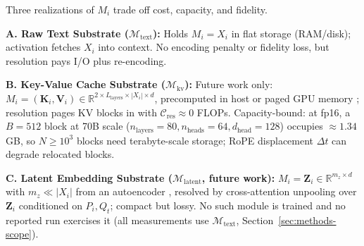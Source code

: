 \documentclass[conference]{IEEEtran}
\begin{document}
{\small
Three realizations of $M_i$ trade off cost, capacity, and fidelity.

\noindent\textbf{A. Raw Text Substrate ($\mathcal{M}_{\text{text}}$):}
Holds $M_i = X_i$ in flat storage (RAM/disk); activation fetches $X_i$ into context. No encoding penalty or fidelity loss, but resolution pays I/O plus re-encoding.

\noindent\textbf{B. Key-Value Cache Substrate ($\mathcal{M}_{\text{kv}}$):}
Future work only: $M_i = (\mathbf{K}_i, \mathbf{V}_i) \in \mathbb{R}^{2 \times L_{\text{layers}} \times |X_i| \times d}$, precomputed in host or paged GPU memory \cite{kwon2023pagedattention}; resolution pages KV blocks in with $\mathcal{C}_{\mathrm{res}} \approx 0$ FLOPs. Capacity-bound: at fp16, a $B{=}512$ block at 70B scale ($n_{\mathrm{layers}}{=}80, n_{\mathrm{heads}}{=}64, d_{\mathrm{head}}{=}128$) occupies $\approx 1.34$\,GB, so $N \ge 10^3$ blocks need terabyte-scale storage; RoPE displacement $\Delta t$ can degrade relocated blocks.

\noindent\textbf{C. Latent Embedding Substrate ($\mathcal{M}_{\text{latent}}$, future work):}
$M_i = \mathbf{Z}_i \in \mathbb{R}^{m_z \times d}$ with $m_z \ll |X_i|$ from an autoencoder \cite{ge2024icae}, resolved by cross-attention unpooling over $\mathbf{Z}_i$ conditioned on $P_i, Q_t$; compact but lossy. No such module is trained and no reported run exercises it (all measurements use $\mathcal{M}_{\text{text}}$, Section~\ref{sec:methods-scope}).

}
\end{document}
